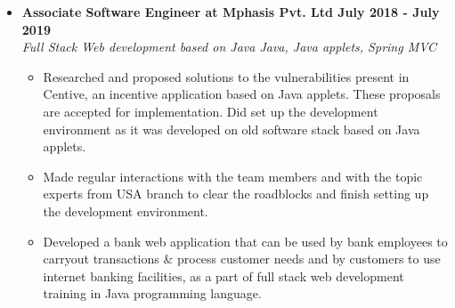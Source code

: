 \documentclass[a4paper,11pt]{article}
\newcommand{\isep}{-2 pt}
\newcommand{\spsep}{-0.75cm}
\begin{document}
\begin{itemize}
	\item \textbf{Associate Software Engineer at Mphasis Pvt. Ltd \hfill July 2018 - July 2019} \\
	\emph{Full Stack Web development based on Java \hfill Java, Java applets, Spring MVC} \\[\spsep]
		\begin{itemize} \itemsep \isep
		\item Researched and proposed solutions to the vulnerabilities present in Centive, an incentive application based on Java applets. These proposals are accepted for implementation. Did set up the development environment as it was developed on old software stack based on Java applets.
		\item Made regular interactions with the team members and with the topic experts from USA branch to clear the roadblocks and finish setting up the development environment.
		\item Developed a bank web application that can be used by bank employees to carryout transactions \& process customer needs and by customers to use internet banking facilities, as a part of full stack web development training in Java programming language.
		\end{itemize}
\end{itemize}
\end{document}
